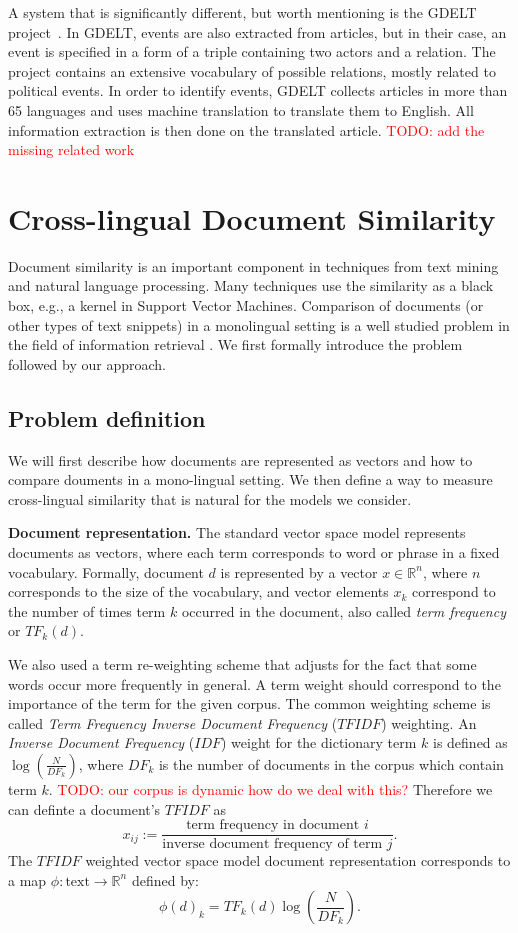 \documentclass[twoside,11pt]{article}
\newcommand{\todo}[1]{\textcolor{red}{TODO: #1}}
\newcommand{\RR}{\mathbb{R}}
\begin{document}
A system that is significantly different, but worth mentioning is the GDELT project~\cite{Leetaru2013Gdelt}. In GDELT, events are also extracted from articles, but in their case, an event is specified in a form of a triple containing two actors and a relation. The project contains an extensive vocabulary of possible relations, mostly related to political events. In order to identify events, GDELT collects articles in more than 65 languages and uses machine translation to translate them to English. All information extraction is then done on the translated article.
\todo{add the missing related work}


\section{Cross-lingual Document Similarity}
\label{sec:crosslingual}
Document similarity is an important component in techniques from text mining and natural language processing. Many techniques use the similarity as a black box, e.g., a kernel in Support Vector Machines. Comparison of documents (or other types of text snippets) in a monolingual setting is a well studied problem in the field of information retrieval \cite{Salton88term-weightingapproaches}. We first formally introduce the problem followed by our approach.

\subsection{Problem definition}\label{sec:tfidf}
We will first describe how documents are represented as vectors and how to compare douments in a mono-lingual setting. We then define a way to measure cross-lingual similarity that is natural for the models we consider.

\noindent\textbf{Document representation.}
The standard vector space model \cite{Salton88term-weightingapproaches} represents documents as vectors, where each term corresponds to word or phrase in a fixed vocabulary. Formally, document $d$ is represented by a vector $x \in \RR^n$, where $n$ corresponds to the size of the vocabulary, and vector elements $x_k$ correspond to the number of times term $k$ occurred in the document, also called \emph{term frequency} or $TF_k(d)$.

We also used a term re-weighting scheme that adjusts for the fact that some words occur more frequently in general. A term weight should correspond to the importance of the term for the given corpus. The common weighting scheme is called \emph{Term Frequency Inverse Document Frequency} ($TFIDF$) weighting. An \emph{Inverse Document Frequency} ($IDF$) weight for the dictionary term $k$ is defined as $\log\left( \frac{N}{DF_k} \right)$, where $DF_k$ is the number of documents in the corpus which contain term $k$. \todo{our corpus is dynamic how do we deal with this?} Therefore we can definte a document's $TFIDF$ as
$$ x_{ij}  := \frac{\mbox{term frequency in document } i}{\mbox{inverse document frequency of term } j}.$$
The $TFIDF$ weighted vector space model document representation corresponds to a map $\phi : \text{text} \rightarrow \RR^n$ defined by:
$$\phi(d)_k = {TF}_k(d) \log\left( \frac{N}{{DF}_k}\right).$$
\end{document}
